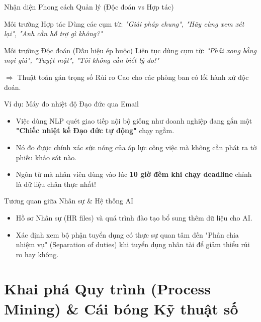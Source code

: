 \documentclass[aspectratio=169]{beamer}
\begin{document}
\begin{frame}{Nhận diện Phong cách Quản lý (Độc đoán vs Hợp tác)}
    \begin{exampleblock}{Môi trường Hợp tác}
        Dùng các cụm từ: \textit{"Giải pháp chung", "Hãy cùng xem xét lại", "Anh cần hỗ trợ gì không?"}
    \end{exampleblock}
    \vspace{0.2cm}
    \begin{alertblock}{Môi trường Độc đoán (Dấu hiệu ép buộc)}
        Liên tục dùng cụm từ: \textit{"Phải xong bằng mọi giá", "Tuyệt mật", "Tôi không cần biết lý do!"}
    \end{alertblock}
    $\Rightarrow$ Thuật toán gán trọng số Rủi ro Cao cho các phòng ban có lối hành xử độc đoán.
\end{frame}

\begin{frame}{Ví dụ: Máy đo nhiệt độ Đạo đức qua Email}
    \begin{itemize}
        \item Việc dùng NLP quét giao tiếp nội bộ giống như doanh nghiệp đang gắn một \textbf{"Chiếc nhiệt kế Đạo đức tự động"} chạy ngầm.
        \item Nó đo được chính xác sức nóng của áp lực công việc mà không cần phát ra tờ phiếu khảo sát nào.
        \item Ngôn từ mà nhân viên dùng vào lúc \textbf{10 giờ đêm khi chạy deadline} chính là dữ liệu chân thực nhất!
    \end{itemize}
\end{frame}

\begin{frame}{Tương quan giữa Nhân sự \& Hệ thống AI}
    \begin{itemize}
        \item Hồ sơ Nhân sự (HR files) và quá trình đào tạo bổ sung thêm dữ liệu cho AI.
        \item Xác định xem bộ phận tuyển dụng có thực sự quan tâm đến "Phân chia nhiệm vụ" (Separation of duties) khi tuyển dụng nhân tài để giảm thiểu rủi ro hay không.
    \end{itemize}
\end{frame}


\section{Khai phá Quy trình (Process Mining) \& Cái bóng Kỹ thuật số}
\end{document}
